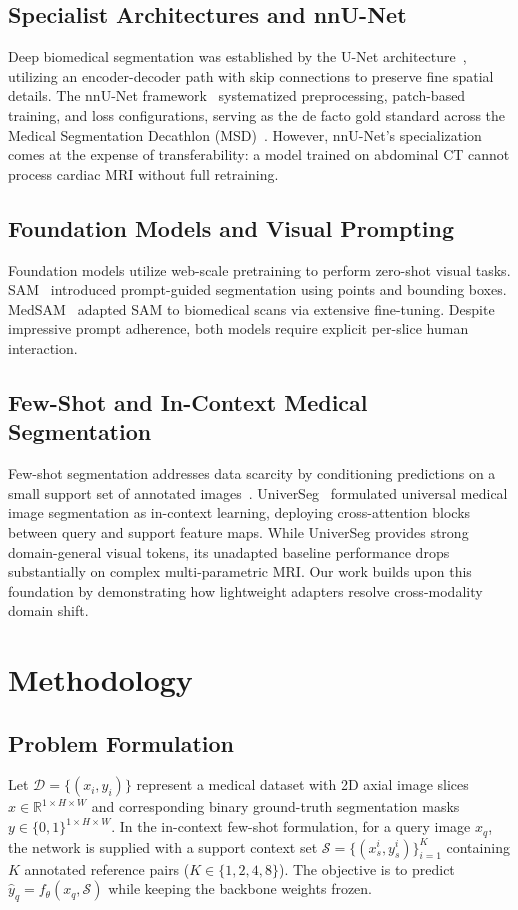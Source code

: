 \documentclass[runningheads]{llncs}
\begin{document}
\subsection{Specialist Architectures and nnU-Net}
Deep biomedical segmentation was established by the U-Net architecture~\cite{ronneberger2015u}, utilizing an encoder-decoder path with skip connections to preserve fine spatial details. The nnU-Net framework~\cite{isensee2021nnu} systematized preprocessing, patch-based training, and loss configurations, serving as the de facto gold standard across the Medical Segmentation Decathlon (MSD)~\cite{simpson2019large}. However, nnU-Net's specialization comes at the expense of transferability: a model trained on abdominal CT cannot process cardiac MRI without full retraining.

\subsection{Foundation Models and Visual Prompting}
Foundation models utilize web-scale pretraining to perform zero-shot visual tasks. SAM~\cite{kirillov2023segment} introduced prompt-guided segmentation using points and bounding boxes. MedSAM~\cite{ma2024segment} adapted SAM to biomedical scans via extensive fine-tuning. Despite impressive prompt adherence, both models require explicit per-slice human interaction.

\subsection{Few-Shot and In-Context Medical Segmentation}
Few-shot segmentation addresses data scarcity by conditioning predictions on a small support set of annotated images~\cite{snell2017prototypical}. UniverSeg~\cite{butoi2023universeg} formulated universal medical image segmentation as in-context learning, deploying cross-attention blocks between query and support feature maps. While UniverSeg provides strong domain-general visual tokens, its unadapted baseline performance drops substantially on complex multi-parametric MRI. Our work builds upon this foundation by demonstrating how lightweight adapters resolve cross-modality domain shift.

\section{Methodology}
\label{sec:method}
\subsection{Problem Formulation}
Let $\mathcal{D} = \{ (x_i, y_i) \}$ represent a medical dataset with 2D axial image slices $x \in \mathbb{R}^{1 \times H \times W}$ and corresponding binary ground-truth segmentation masks $y \in \{0, 1\}^{1 \times H \times W}$. In the in-context few-shot formulation, for a query image $x_q$, the network is supplied with a support context set $\mathcal{S} = \{ (x_s^i, y_s^i) \}_{i=1}^K$ containing $K$ annotated reference pairs ($K \in \{1, 2, 4, 8\}$). The objective is to predict $\hat{y}_q = f_\theta(x_q, \mathcal{S})$ while keeping the backbone weights frozen.
\end{document}
